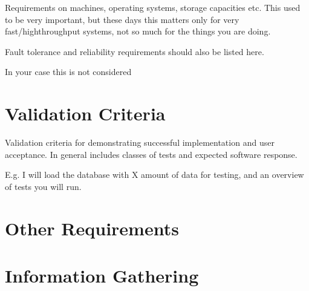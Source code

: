 \documentclass[a4wide]{article}
\begin{document}
Requirements on machines, operating systems, storage capacities etc.
This used to be very important, but these days this matters only
for very fast/highthroughput systems, not so much for the things you
are doing.

Fault tolerance and reliability requirements should also be listed here.

In your case this is not considered


\section{Validation Criteria}

Validation criteria for demonstrating
successful implementation and user acceptance.
In general includes classes of tests and expected software response.

E.g. I will load the database with X amount of data for testing,
and an overview of tests you will run.


\section{Other Requirements}
\newpage
\appendix
\appendixpage

\section{Information Gathering}
\end{document}

